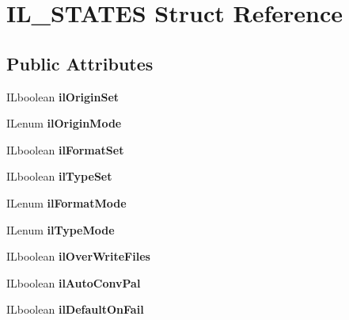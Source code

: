 \hypertarget{structIL__STATES}{}\section{I\+L\+\_\+\+S\+T\+A\+T\+ES Struct Reference}
\label{structIL__STATES}
\subsection*{Public Attributes}
\begin{DoxyCompactItemize}
\item 
\mbox{\label{structIL__STATES_a56ab66e836f8d0db0a55f5164abf325b}} 
I\+Lboolean {\bfseries il\+Origin\+Set}
\item 
\mbox{\label{structIL__STATES_a0c6916e3d78b65a7b04ae41124e99372}} 
I\+Lenum {\bfseries il\+Origin\+Mode}
\item 
\mbox{\label{structIL__STATES_a263f84e079d540714718c9827abbe26c}} 
I\+Lboolean {\bfseries il\+Format\+Set}
\item 
\mbox{\label{structIL__STATES_ad976326e32b8b47da6f8d131efef85ef}} 
I\+Lboolean {\bfseries il\+Type\+Set}
\item 
\mbox{\label{structIL__STATES_ab796956a0dcf47d8e04ae29ea56d4920}} 
I\+Lenum {\bfseries il\+Format\+Mode}
\item 
\mbox{\label{structIL__STATES_abbeab07c0c312c205b2e52751529528d}} 
I\+Lenum {\bfseries il\+Type\+Mode}
\item 
\mbox{\label{structIL__STATES_a9cd34327dbc0424937b0d99acdfd5735}} 
I\+Lboolean {\bfseries il\+Over\+Write\+Files}
\item 
\mbox{\label{structIL__STATES_a9c2879f95c4a26ef7314c19a2baee01a}} 
I\+Lboolean {\bfseries il\+Auto\+Conv\+Pal}
\item 
\mbox{\label{structIL__STATES_a77ba2fe12cc5735fa8dac9bfb08bb24e}} 
I\+Lboolean {\bfseries il\+Default\+On\+Fail}
\item 

\end{DoxyCompactItemize}
